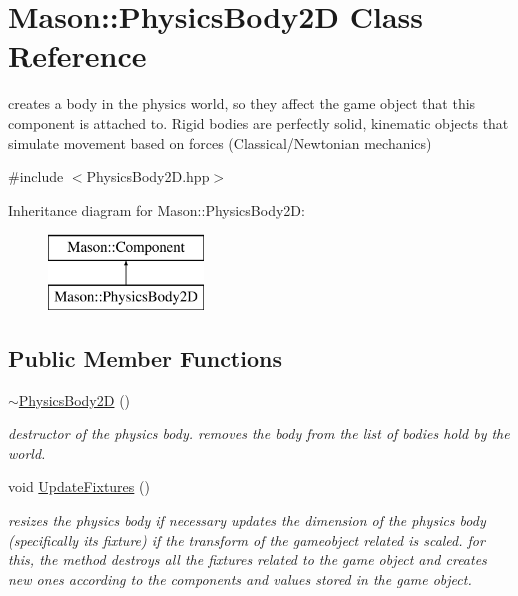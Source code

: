 \hypertarget{class_mason_1_1_physics_body2_d}{}\section{Mason\+:\+:Physics\+Body2D Class Reference}
\label{class_mason_1_1_physics_body2_d}


creates a body in the physics world, so they affect the game object that this component is attached to. Rigid bodies are perfectly solid, kinematic objects that simulate movement based on forces (Classical/\+Newtonian mechanics)  




{\ttfamily \#include $<$Physics\+Body2\+D.\+hpp$>$}

Inheritance diagram for Mason\+:\+:Physics\+Body2D\+:\begin{figure}[H]
\begin{center}
\leavevmode
\includegraphics[height=2.000000cm]{class_mason_1_1_physics_body2_d}
\end{center}
\end{figure}
\subsection*{Public Member Functions}
\begin{DoxyCompactItemize}
\item 
\hyperlink{class_mason_1_1_physics_body2_d_a9cd23100f41c0ae3dbce853e88f804e1}{$\sim$\+Physics\+Body2D} ()
\begin{DoxyCompactList}\small\item\em destructor of the physics body. removes the body from the list of bodies hold by the world. \end{DoxyCompactList}\item 
void \hyperlink{class_mason_1_1_physics_body2_d_adabfbe103ece98e01024752ef939158d}{Update\+Fixtures} ()
\begin{DoxyCompactList}\small\item\em resizes the physics body if necessary updates the dimension of the physics body (specifically its fixture) if the transform of the gameobject related is scaled. for this, the method destroys all the fixtures related to the game object and creates new ones according to the components and values stored in the game object. \end{DoxyCompactList}\end{DoxyCompactItemize}

